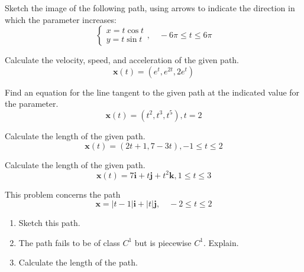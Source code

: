 \documentclass[boxes]{gsypset}
\begin{document}

\begin{problem}[3.1.3]
	Sketch the image of the following path, using
	arrows to indicate the direction in which the parameter increases:
	\[
		\begin{cases}
			x=t\cos t\\
			y=t\sin t
		\end{cases},
		\quad-6\pi\leq t\leq6\pi
	\]
\end{problem}
\begin{solution}
	
\end{solution}

\begin{problem}[3.1.10]
	Calculate the velocity, speed, and acceleration of the given path.
	\[
		\mathbf{x}(t)=(e^t,e^{2t},2e^t)
	\]
\end{problem}
\begin{solution}
	
\end{solution}

\begin{problem}[3.1.17]
	Find an equation for the line tangent to the
	given path at the indicated value for the parameter.
	\[
		\mathbf{x}(t)=(t^2,t^3,t^5),t=2
	\]
\end{problem}
\begin{solution}
	
\end{solution}

\begin{problem}[3.2.1]
	Calculate the length of the given path.
	\[
		\mathbf{x}(t)=(2t+1,7-3t),-1\leq t\leq2
	\]
\end{problem}
\begin{solution}
	
\end{solution}

\begin{problem}[3.2.4]
	Calculate the length of the given path.
	\[
		\mathbf{x}(t)=7\mathbf{i}+t\mathbf{j}+t^2\mathbf{k},1\leq t\leq3
	\]
\end{problem}
\begin{solution}
	
\end{solution}

\begin{problem}[3.2.13]
	This problem concerns the path 
	\[
		\mathbf{x} = |t-1|\mathbf{i} + |t|\mathbf{j}, \quad -2 \leq t \leq 2
	\]
	\begin{enumerate}
		\item Sketch this path.
		\item The path fails to be of class $C^1$ but is piecewise $C^1$.
			Explain.
		\item Calculate the length of the path.
	\end{enumerate}
\end{problem}
\begin{solution}
	
\end{solution}
\end{document}
